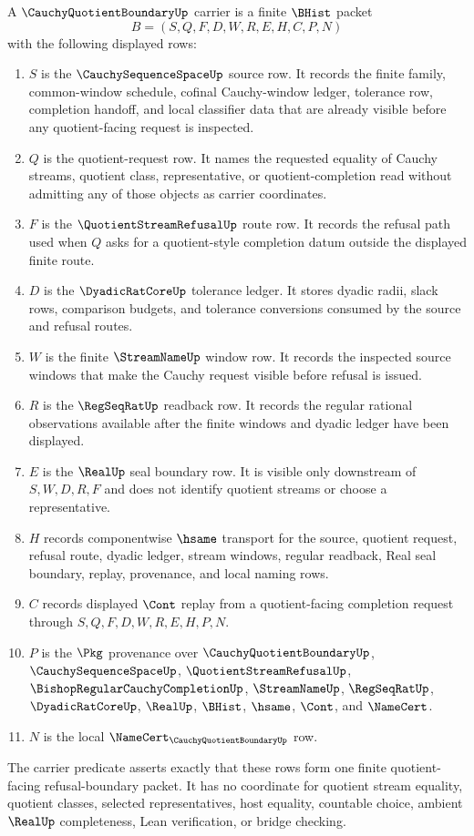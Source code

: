 \begin{definition}\label{def:cauchy-quotient-boundary-carrier}
A $\CauchyQuotientBoundaryUp$ carrier is a finite $\BHist$ packet
$$
B=(S,Q,F,D,W,R,E,H,C,P,N)
$$
with the following displayed rows:
\begin{enumerate}
\item $S$ is the $\CauchySequenceSpaceUp$ source row. It records the finite family, common-window schedule, cofinal Cauchy-window ledger, tolerance row, completion handoff, and local classifier data that are already visible before any quotient-facing request is inspected.
\item $Q$ is the quotient-request row. It names the requested equality of Cauchy streams, quotient class, representative, or quotient-completion read without admitting any of those objects as carrier coordinates.
\item $F$ is the $\QuotientStreamRefusalUp$ route row. It records the refusal path used when $Q$ asks for a quotient-style completion datum outside the displayed finite route.
\item $D$ is the $\DyadicRatCoreUp$ tolerance ledger. It stores dyadic radii, slack rows, comparison budgets, and tolerance conversions consumed by the source and refusal routes.
\item $W$ is the finite $\StreamNameUp$ window row. It records the inspected source windows that make the Cauchy request visible before refusal is issued.
\item $R$ is the $\RegSeqRatUp$ readback row. It records the regular rational observations available after the finite windows and dyadic ledger have been displayed.
\item $E$ is the $\RealUp$ seal boundary row. It is visible only downstream of $S,W,D,R,F$ and does not identify quotient streams or choose a representative.
\item $H$ records componentwise $\hsame$ transport for the source, quotient request, refusal route, dyadic ledger, stream windows, regular readback, Real seal boundary, replay, provenance, and local naming rows.
\item $C$ records displayed $\Cont$ replay from a quotient-facing completion request through $S,Q,F,D,W,R,E,H,P,N$.
\item $P$ is the $\Pkg$ provenance over $\CauchyQuotientBoundaryUp$, $\CauchySequenceSpaceUp$, $\QuotientStreamRefusalUp$, $\BishopRegularCauchyCompletionUp$, $\StreamNameUp$, $\RegSeqRatUp$, $\DyadicRatCoreUp$, $\RealUp$, $\BHist$, $\hsame$, $\Cont$, and $\NameCert$.
\item $N$ is the local $\NameCert_{\CauchyQuotientBoundaryUp}$ row.
\end{enumerate}
The carrier predicate asserts exactly that these rows form one finite quotient-facing refusal-boundary packet. It has no coordinate for quotient stream equality, quotient classes, selected representatives, host equality, countable choice, ambient $\RealUp$ completeness, Lean verification, or bridge checking.
\end{definition}
